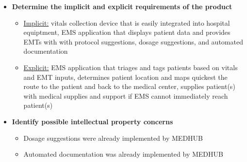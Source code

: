 \documentclass[man]{article}
\begin{document}
\begin{itemize}
      \newpage

      \item \textbf{Determine the implicit and explicit requirements of the product}
      \begin{itemize}
        \item \underline{Implicit:} vitals collection device that is easily integrated into hospital equiptment, EMS application that displays patient data and provides EMTs with with protocol suggestions, dosage suggestions, and automated documentation
        \item \underline{Explicit:} EMS application that triages and tags patients based on vitals and EMT inputs, determines patient location and maps quickest the route to the patient and back to the medical center, supplies patient(s) with medical supplies and support if EMS cannot immediately reach patient(s)
      \end{itemize}

      \item \textbf{Identify possible intellectual property concerns}
      \begin{itemize}
        \item Dosage suggestions were already implemented by MEDHUB
        \item Automated documentation was already implemented by MEDHUB
      \end{itemize}
    \end{itemize}

  \newpage
\end{document}
